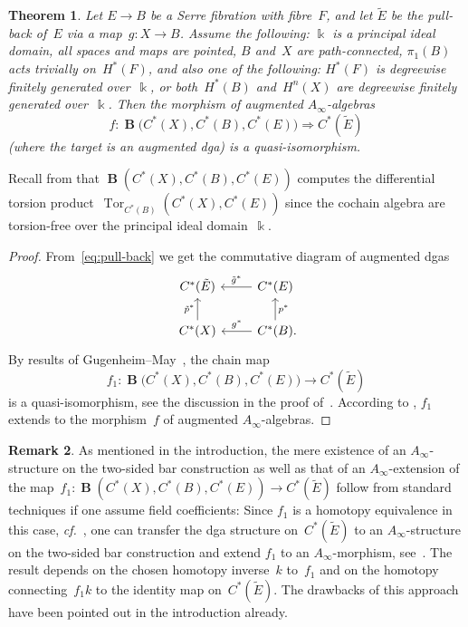 \documentclass[letterpaper]{amsart}
\numberwithin{equation}{section}
\theoremstyle{plain}
\newtheorem{theorem}{Theorem}[section]
\theoremstyle{definition}
\newtheorem{remark}[theorem]{Remark}
\theoremstyle{remark}
\def\cf{\emph{cf.}}
\DeclareMathOperator{\Tor}{Tor}
\def\Ainf{A_{\infty}}
\DeclareMathOperator{\BB}{\mathbf{B}}
\def\kk{\Bbbk}
\def\gE{\tilde{E}}
\def\gp{\tilde{p}}
\begin{document}
\begin{theorem}
  \label{thm:em-ainf}
  Let $E\to B$ be a Serre fibration with fibre~$F$, and let $\gE$ be the pull-back of~$E$ via a map~$g\colon X\to B$.
  Assume the following: $\kk$ is a principal ideal domain, all spaces and maps are pointed,
  $B$ and~$X$ are path-connected, $\pi_{1}(B)$ acts trivially on~$H^{*}(F)$, and also one of the following:
  $H^{*}(F)$ is degreewise finitely generated over~$\kk$, or both~$H^{*}(B)$ and~$H^{n}(X)$ are degreewise finitely generated over~$\kk$.
  Then the morphism of augmented $\Ainf$-algebras
  \begin{equation*}
    f\colon \BB\bigl(C^{*}(X),C^{*}(B),C^{*}(E)\bigr) \Rightarrow C^{*}(\gE)
  \end{equation*}
  (where the target is an augmented dga) is a quasi-isomorphism.
\end{theorem}

Recall from  that $\BB(C^{*}(X),C^{*}(B),C^{*}(E))$ computes
the differential torsion product~$\Tor_{C^{*}(B)}(C^{*}(X),C^{*}(E))$
since the cochain algebra are torsion-free over the principal ideal domain~$\kk$.

\begin{proof}
  From~\eqref{eq:pull-back} we get the commutative diagram of augmented dgas
  \begin{equation}
    \begin{tikzcd}
      C^{*}(\gE) & C^{*}(E) \arrow{l}[above]{\tilde{g}^{*}} \\
      C^{*}(X) \arrow{u}{\gp^{*}} & C^{*}(B) \arrow{l}[above]{g^{*}} \arrow{u}[right]{p^{*}} \mathrlap{.}
    \end{tikzcd}
  \end{equation}
  By results of Gugenheim--May~\cite[Ch.~3]{GugenheimMay:1974}, the chain map
  \begin{equation*}
    f_{1}\colon \BB\bigl(C^{*}(X),C^{*}(B),C^{*}(E)\bigr) \to C^{*}(\gE)
  \end{equation*}
  is a quasi-isomorphism, see the discussion in the proof of~\cite[Thm.~A.27]{CarlsonFranz}.
  According to , $f_{1}$ extends to the morphism~$f$ of augmented $\Ainf$-algebras.
\end{proof}

\begin{remark}
  \label{rem:transfer}
  As mentioned in the introduction, the mere existence of an $\Ainf$-structure on the two-sided
  bar construction as well as that of an $\Ainf$-extension of the map~$f_{1}\colon \BB(C^{*}(X),C^{*}(B),C^{*}(E))\to C^{*}(\gE)$
  follow from standard techniques if one assume field coefficients:
  Since $f_{1}$ is a homotopy equivalence in this case, \cf~\cite[Prop.~II.4.3]{Dold:1980},
  one can transfer the dga structure on~$C^{*}(\gE)$ to an $\Ainf$-structure
  on the two-sided bar construction and extend $f_{1}$ to an $\Ainf$-morphism, see~\cite{Markl:2006}.
  The result depends on the chosen homotopy inverse~$k$ to~$f_{1}$ and on the homotopy
  connecting~$f_{1}k$ to the identity map on~$C^{*}(\gE)$. The drawbacks of this approach have been pointed out
  in the introduction already.
\end{remark}
\end{document}

